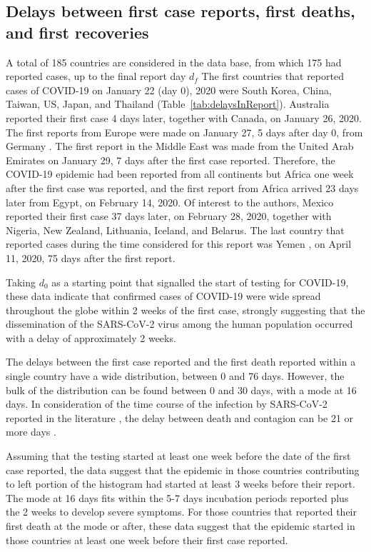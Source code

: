 \documentclass[8pt]{article}
\begin{document}
\subsection{Delays between first case reports, first deaths, and first recoveries}

A total of 185 countries are considered in the data base, from which 175 had reported cases, up to the final report day $d_f$ 
The first countries that reported cases of COVID-19 on January 22 (day 0), 2020 were South Korea, China, Taiwan, US, Japan, and Thailand (Table~\ref{tab:delaysInReport}). Australia reported their first case 4 days later, together with Canada, on January 26, 2020. The first reports from Europe were made  on January 27, 5 days after day 0, from Germany \citep{rothe2020transmission}. The first report in the Middle East was made from the United Arab Emirates on January 29, 7 days after the first case reported.  Therefore, the COVID-19 epidemic had been reported from all continents but Africa one week after the first case was reported, and the first report from Africa arrived 23 days later from Egypt, on February 14, 2020. Of interest to the authors, Mexico reported their first case 37 days later, on February 28, 2020, together with Nigeria, New Zealand, Lithuania, Iceland, and Belarus. The last country that reported cases during the time considered for this report was Yemen , on April 11, 2020, 75 days after the first report.

Taking $d_0$ as a starting point that signalled the start of testing for COVID-19, these data indicate that confirmed  cases of COVID-19 were wide spread throughout the globe within 2 weeks of the first case, strongly suggesting that the dissemination of the SARS-CoV-2 virus among the human population occurred with a delay of approximately 2 weeks. 


The delays between the first case reported and the first death reported within a single country have a wide distribution, between 0 and 76 days. 
However, the bulk of the distribution can be found between 0 and 30 days, with a mode at 16 days. In consideration of the time course of the infection by SARS-CoV-2 reported in the literature \citep{}, the delay between death and contagion can be 21 or more days \citep{}. 

Assuming that the testing started at least one week before the date of the first case reported, the data suggest that the epidemic in those countries contributing to left portion of the histogram had started at least 3 weeks before their report. The mode at 16 days fits within the 5-7 days incubation periods reported plus the 2 weeks to develop severe symptoms. For those countries that reported their first death at the mode or after, these data suggest that the epidemic started in those countries at least one week before their first case reported.
\end{document}
